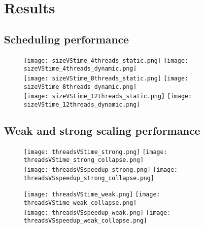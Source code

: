 \section{Results}\label{sec:result}

\subsection{Scheduling performance}\label{sec:res-sched}


\begin{figure}[p!]
    \centering
    \null\hfill
    \texttt{[image: sizeVStime\_4threads\_static.png]}
    \null\hfill
    \texttt{[image: sizeVStime\_4threads\_dynamic.png]}
    \null\hfill
    \\
    \null\hfill
    \texttt{[image: sizeVStime\_8threads\_static.png]}
    \null\hfill
    \texttt{[image: sizeVStime\_8threads\_dynamic.png]}
    \null\hfill
    \\
    \null\hfill
    \texttt{[image: sizeVStime\_12threads\_static.png]}
    \null\hfill
    \texttt{[image: sizeVStime\_12threads\_dynamic.png]}
    \null\hfill
    \caption{\label{fig:sched}}
\end{figure}

\subsection{Weak and strong scaling performance}\label{sec:res-scale}

\begin{figure}[h!]
    \centering
    \null\hfill
    \texttt{[image: threadsVStime\_strong.png]}
    \null\hfill
    \texttt{[image: threadsVStime\_strong\_collapse.png]}
    \null\hfill
    \\
    \null\hfill
    \texttt{[image: threadsVSspeedup\_strong.png]}
    \null\hfill
    \texttt{[image: threadsVSspeedup\_strong\_collapse.png]}
    \null\hfill
    \caption{\label{fig:strong_scale}}
\end{figure}

\begin{figure}[h!]
    \centering
    \null\hfill
    \texttt{[image: threadsVStime\_weak.png]}
    \null\hfill
    \texttt{[image: threadsVStime\_weak\_collapse.png]}
    \null\hfill
    \\
    \null\hfill
    \texttt{[image: threadsVSspeedup\_weak.png]}
    \null\hfill
    \texttt{[image: threadsVSspeedup\_weak\_collapse.png]}
    \null\hfill
    \caption{\label{fig:strong_scale}}
\end{figure}
